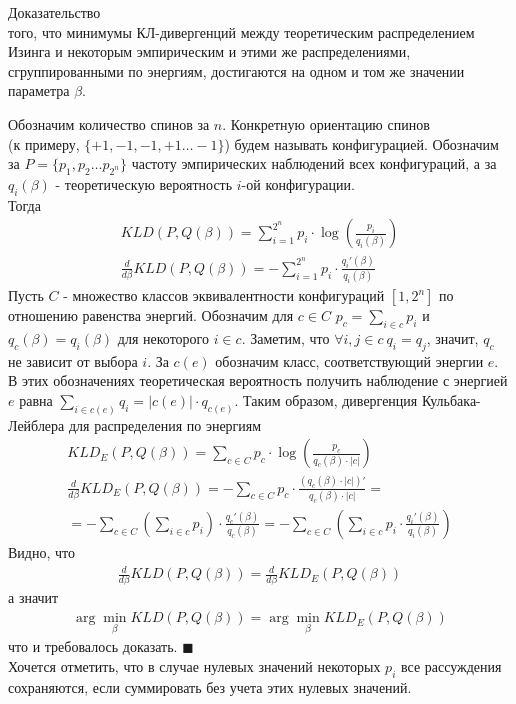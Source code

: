 \documentclass[12pt]{article} %
\begin{document}
	\begin{center}
		{\Large Доказательство}\\
		того, что минимумы КЛ-дивергенций между теоретическим распределением Изинга и некоторым эмпирическим и этими же распределениями, сгруппированными по энергиям, достигаются на одном и том же значении параметра $\beta$. 
	\end{center}
Обозначим количество спинов за $n$. Конкретную ориентацию спинов\\ (к примеру, $\{+1, -1, -1, +1 \ldots -1\}$) будем называть конфигурацией. Обозначим за $P = \{p_1, p_2 \ldots p_{2^n}\}$ частоту эмпирических наблюдений всех конфигураций, а за $q_i(\beta)$ - теоретическую вероятность $i$-ой конфигурации.\\
Тогда
\begin{align*}
	KLD(P, Q(\beta)) = \sum\limits_{i = 1}^{2^n}p_i\cdot\log(\frac{p_i}{q_i(\beta)})\\
	\frac{d}{d\beta}KLD(P, Q(\beta)) = - \sum\limits_{i = 1}^{2^n}p_i \cdot \frac{q_i'(\beta)}{q_i(\beta)}
\end{align*}
Пусть $C$ - множество классов эквивалентности конфигураций $[1, 2^n]$ по отношению равенства энергий. Обозначим для $c \in C$ $p_c = \sum\limits_{i \in c}p_i$ и $q_c(\beta) = q_i(\beta) \text{ для некоторого } i \in c$. Заметим, что $\forall i, j \in c\  q_i = q_j$, значит, $q_c$ не зависит от выбора $i$. За $c(e)$ обозначим класс, соответствующий энергии $e$. В этих обозначениях теоретическая вероятность получить наблюдение с энергией $e$ равна  $\sum\limits_{i \in c(e)}q_i = |c(e)|\cdot q_{c(e)}$. Таким образом, дивергенция Кульбака-Лейблера для распределения по энергиям
\begin{align*}
	KLD_E(P, Q(\beta)) = \sum\limits_{c \in C}p_c \cdot \log(\frac{p_c}{q_c(\beta)\cdot |c|})\\
	\frac{d}{d\beta}KLD_E(P, Q(\beta)) = -\sum\limits_{c \in C}p_c \cdot \frac{(q_c(\beta)\cdot |c|)'}{q_c(\beta)\cdot |c|} =\\= -\sum\limits_{c \in C}\left(\sum\limits_{i \in c} p_i\right)\cdot \frac{q_c'(\beta)}{q_c(\beta)} = -\sum\limits_{c \in C}\left(\sum\limits_{i \in c} p_i\cdot \frac{q_i'(\beta)}{q_i(\beta)} \right)
\end{align*}
Видно, что
\begin{align*}
\frac{d}{d\beta}KLD(P, Q(\beta)) = \frac{d}{d\beta}KLD_E(P, Q(\beta))
\end{align*}
а значит
\begin{align*}
\arg\min\limits_\beta KLD(P, Q(\beta)) = \arg\min\limits_\beta KLD_E(P, Q(\beta))
\end{align*}
что и требовалось доказать. \hfill $\blacksquare$\\

Хочется отметить, что в случае нулевых значений некоторых $p_i$ все рассуждения сохраняются, если суммировать без учета этих нулевых значений.
\end{document}
